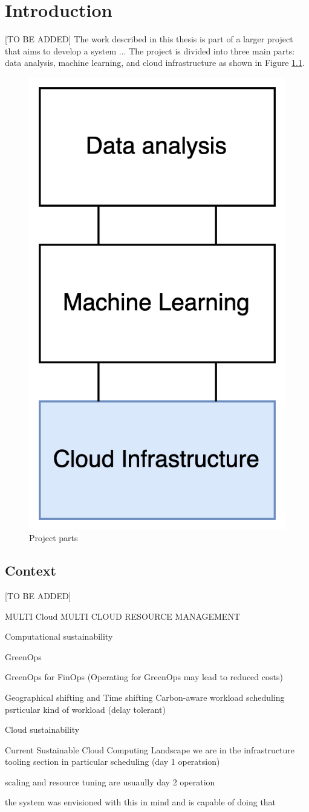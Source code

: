 \chapter{Introduction}
\label{cha:introduction}

[TO BE ADDED]
The work described in this thesis is part of a larger project that aims to develop a system ... 
The project is divided into three main parts: data analysis, machine learning, and cloud infrastructure as shown in Figure \ref{fig:project_parts}.

\begin{figure}[htb]
    \centering
    \includegraphics[width=0.25\linewidth]{images/project_parts.png}
    \caption{Project parts}
    \label{fig:project_parts}
\end{figure}

\section{Context}
\label{sec:context}

[TO BE ADDED]

MULTI Cloud
MULTI CLOUD RESOURCE MANAGEMENT


Computational sustainability

GreenOps

GreenOps for FinOps
(Operating for GreenOps may lead to reduced costs)

Geographical shifting and Time shifting
Carbon-aware workload scheduling
psrticular kind of workload (delay tolerant)


Cloud sustainability

Current Sustainable Cloud Computing Landscape
we are in the infrastructure tooling section
in particular scheduling (day 1 operatsion)

scaling and resource tuning are usuaully day 2 operation

the system was envisioned with this in mind and is capable of doing that



